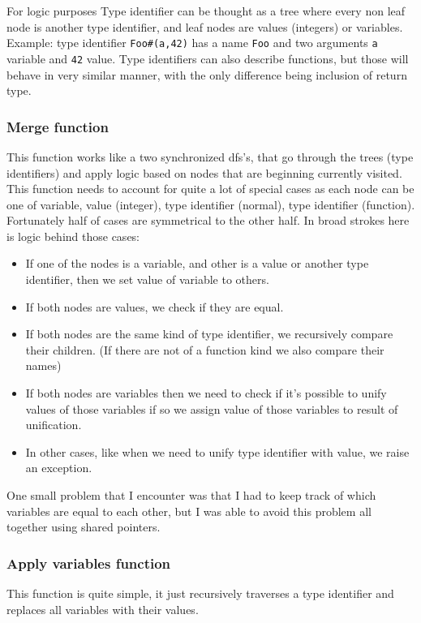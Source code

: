 \documentclass[12pt]{report}
\begin{document}
For logic purposes Type identifier can be thought as a tree where every non leaf node is another type identifier, and leaf nodes are values (integers) or variables. 
Example: type identifier \verb!Foo#(a,42)! has a name \verb!Foo! and two arguments \verb!a! variable and \verb!42! value. Type identifiers can also describe functions, but those will behave in very similar manner, with the only difference being inclusion of return type.

\subsubsection{Merge function}
This function works like a two synchronized dfs's, that go through the trees (type identifiers) and apply logic based on nodes that are beginning currently visited.
This function needs to account for quite a lot of special cases as each node can be one of variable, value (integer), type identifier (normal), type identifier (function). Fortunately half of cases are symmetrical to the other half. In broad strokes here is logic behind those cases:
\begin{itemize}
    \item If one of the nodes is a variable, and other is a value or another type identifier, then we set value of variable to others.
    \item If both nodes are values, we check if they are equal.
    \item If both nodes are the same kind of type identifier, we recursively compare their children. (If there are not of a function kind we also compare their names)
    \item If both nodes are variables then we need to check if it's possible to unify values of those variables if so we assign value of those variables to result of unification.
    \item In other cases, like when we need to unify type identifier with value, we raise an exception.
\end{itemize}
One small problem that I encounter was that I had to keep track of which variables are equal to each other, but I was able to avoid this problem all together using shared pointers.
\subsubsection{Apply variables function}
This function is quite simple, it just recursively traverses a type identifier and replaces all variables with their values.
\end{document}
